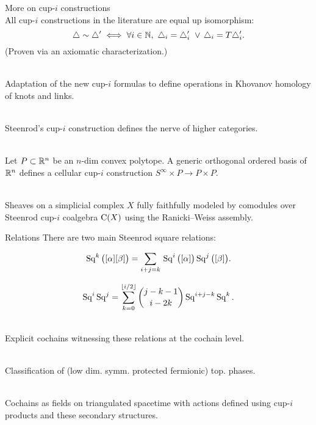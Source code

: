 \begin{frame}{More on cup-$i$ constructions}
	\pause
	 \\
	All cup-$i$ constructions in the literature are equal up isomorphism:
	\vskip -7.5pt
	\[
	\triangle \sim \triangle^\prime \iff \forall i \in \mathbb{N}, \ \triangle_i = \triangle_i^\prime \ \vee \, \triangle_i = T \triangle_i^\prime.
	\]
	\vskip -3pt
	(Proven via an axiomatic characterization.)

	\medskip\pause
	 \\
	Adaptation of the new cup-$i$ formulas to define operations in Khovanov homology of knots and links.

	\medskip\pause
	 \\
	Steenrod's cup-$i$ construction defines the nerve of higher categories.

	\medskip\pause
	 \\
	Let $P \subset \mathbb{R}^n$ be an $n$-dim convex polytope.
	A generic orthogonal ordered basis of $\mathbb{R}^n$ defines a cellular cup-$i$ construction $S^\infty \times P \to P \times P$.

	\medskip\pause
	 \\
	Sheaves on a simplicial complex $X$ fully faithfully modeled by comodules over Steenrod cup-$i$ coalgebra $\operatorname{C}(X)$ using the Ranicki--Weiss assembly.
\end{frame}

\begin{frame}{Relations}
	\pause
	There are two main Steenrod square relations:

	\bigskip\pause
	\vspace*{-5pt}
	\begin{equation*}
		\operatorname{Sq}^k \big( [\alpha] [\beta] \big) =
		\sum_{i+j=k} \, \operatorname{Sq}^i\big([\alpha]\big) \operatorname{Sq}^j\big([\beta]\big).
	\end{equation*}

	\pause
	\vspace*{-5pt}
	\begin{equation*}
		\operatorname{Sq}^i \operatorname{Sq}^j =
		\sum_{k=0}^{\lfloor i/2 \rfloor} \binom{j-k-1}{i-2k} \operatorname{Sq}^{i+j-k} \operatorname{Sq}^k.
	\end{equation*}

	\medskip\pause
	 \\
	Explicit cochains witnessing these relations at the cochain level.

	\medskip\pause
	 \\
	Classification of (low dim. symm. protected fermionic) top. phases.

	\medskip\pause
	 \\
	Cochains as fields on triangulated spacetime with actions defined using cup-$i$ products and these secondary structures.
\end{frame}